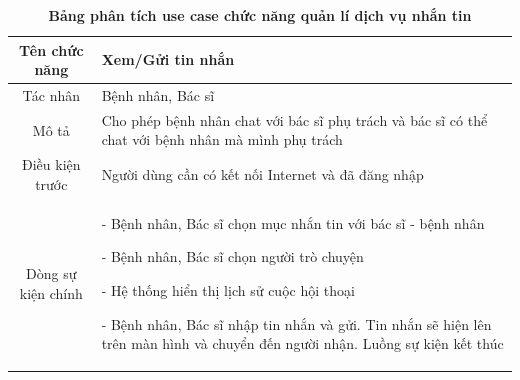   \begin{table}[H]
    \caption{\bfseries \fontsize{12pt}{0pt}\selectfont Bảng phân tích use case chức năng quản lí dịch vụ nhắn tin}
    \centering
    \begin{tabularx}{0.9\textwidth}{|c|X|}
      \hline
      \textbf{Tên chức năng} & \textbf{Xem/Gửi tin nhắn} \\
      \hline
      Tác nhân & Bệnh nhân, Bác sĩ \\
      \hline
      Mô tả & Cho phép bệnh nhân chat với bác sĩ phụ trách và bác sĩ có thể chat với bệnh nhân mà mình phụ trách \\
      \hline
      Điều kiện trước & Người dùng cần có kết nối Internet và đã đăng nhập \\
      \hline
      Dòng sự kiện chính & 
        - Bệnh nhân, Bác sĩ chọn mục nhắn tin với bác sĩ - bệnh nhân

        - Bệnh nhân, Bác sĩ chọn người trò chuyện
        
        - Hệ thống hiển thị lịch sử cuộc hội thoại

        - Bệnh nhân, Bác sĩ nhập tin nhắn và gửi. Tin nhắn sẽ hiện lên trên màn hình và chuyển đến người nhận. Luồng sự kiện kết thúc
        \\
      \hline
    \end{tabularx}
  \end{table}

